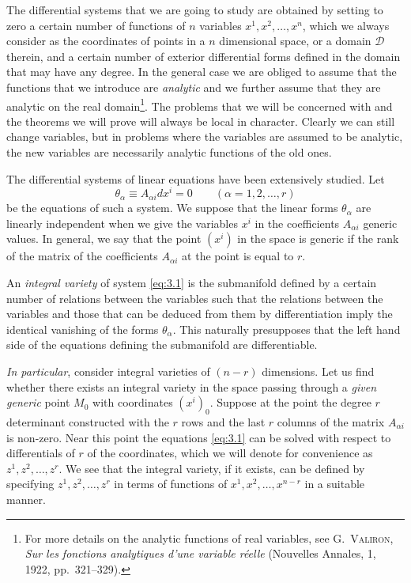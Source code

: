 \documentclass[leqno,11pt]{book}
\numberwithin{equation}{chapter}
\theoremstyle{shape1}
\theoremstyle{shape0}
\theoremstyle{shape2}
\theoremstyle{definition}
\begin{document}
\fsec The differential systems that we are going to study are obtained by setting to zero a certain number of functions of $n$ variables $x^{1},x^{2},\dots,x^{n}$, which we always consider as the coordinates of  points in a $n$ dimensional space, or a domain $\mathcal{D}$ therein, and a certain number of exterior differential forms defined in the domain that may have any degree.  In the general case we are obliged  to assume that  the functions that we introduce are  \emph{analytic} and we further assume  that they are analytic on the real domain\footnote{For more details on the analytic functions of real variables, see \textsc{G.~Valiron}, \emph{Sur les fonctions analytiques d'une variable r\'eelle} (Nouvelles Annales, 1, 1922, pp.~321--329).}. The problems that we will be concerned with and the theorems we will prove will always be local in character. Clearly we can still change variables, but in  problems where the variables are assumed to be analytic, the new variables are necessarily analytic functions of the old ones.

\vspace{12pt}\fsec {}The differential systems of linear equations have been extensively studied. Let
\begin{equation}
  \label{eq:3.1}
  \theta_{\alpha}\equiv A_{\alpha i}dx^{i}=0\qquad(\alpha=1,2,\dots,r)
\end{equation}
be the equations of such a system. We suppose that the linear forms $\theta_{\alpha}$ are linearly independent when we give the variables $x^{i}$ in the coefficients $A_{\alpha i}$ generic values. In general, we say that the point $(x^{i})$ in the space is generic if the rank of the matrix of the coefficients $A_{\alpha i}$  at the point is equal to $r$.

An \emph{integral variety} of  system \eqref{eq:3.1} is  the submanifold defined by a certain number of relations between the variables such that the relations between the variables and those that  can be deduced from them by differentiation imply the identical vanishing of the forms $\theta_{\alpha}$. This naturally presupposes that the left hand side of the equations defining the submanifold are differentiable.

\emph{In particular}, consider integral varieties of $(n-r)$ dimensions.  Let us find whether there exists an integral variety in the space passing through a \emph{given generic} point $M_{0}$ with coordinates $(x^{i})_{0}$. Suppose at the point the degree $r$ determinant constructed with the $r$ rows and the last $r$ columns of the matrix $A_{\alpha i}$ is non-zero.  Near this point the equations \eqref{eq:3.1} can be solved with respect to differentials of  $r$ of the coordinates, which we will denote for convenience as $z^{1},z^{2},\dots,z^{r}$. We see that the integral variety, if it exists, can be defined by specifying  $z^{1},z^{2},\dots,z^{r}$ in terms of functions of $x^{1},x^{2},\dots,x^{n-r}$ in a suitable manner.
\end{document}
